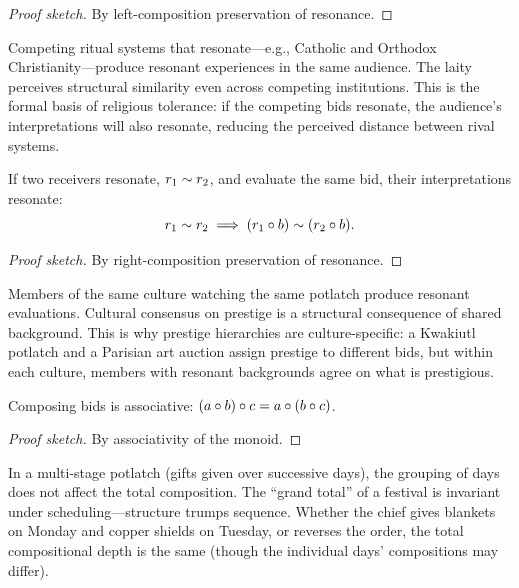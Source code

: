 \begin{proof}[Proof sketch]
By left-composition preservation of resonance.
\end{proof}

Competing ritual systems that resonate---e.g., Catholic and Orthodox
Christianity---produce resonant experiences in the same audience.  The laity
perceives structural similarity even across competing institutions.  This
is the formal basis of religious tolerance: if the competing bids resonate,
the audience's interpretations will also resonate, reducing the perceived
distance between rival systems.

\begin{theorem}
\label{thm:resonant-receivers}
If two receivers resonate, $r_1 \sim r_2$, and evaluate the same bid, their
interpretations resonate:
\[
  r_1 \sim r_2
  \;\Longrightarrow\;
  (r_1 \circ b) \sim (r_2 \circ b).
\]
\end{theorem}

\begin{proof}[Proof sketch]
By right-composition preservation of resonance.
\end{proof}

Members of the same culture watching the same potlatch produce resonant
evaluations.  Cultural consensus on prestige is a structural consequence of
shared background.  This is why prestige hierarchies are culture-specific:
a Kwakiutl potlatch and a Parisian art auction assign prestige to different
bids, but within each culture, members with resonant backgrounds agree on
what is prestigious.

\begin{theorem}
\label{thm:bid-assoc}
Composing bids is associative:
$(a \circ b) \circ c = a \circ (b \circ c)$.
\end{theorem}

\begin{proof}[Proof sketch]
By associativity of the monoid.
\end{proof}

In a multi-stage potlatch (gifts given over successive days), the grouping of
days does not affect the total composition.  The ``grand total'' of a
festival is invariant under scheduling---structure trumps sequence.  Whether
the chief gives blankets on Monday and copper shields on Tuesday, or reverses
the order, the total compositional depth is the same (though the individual
days' compositions may differ).


